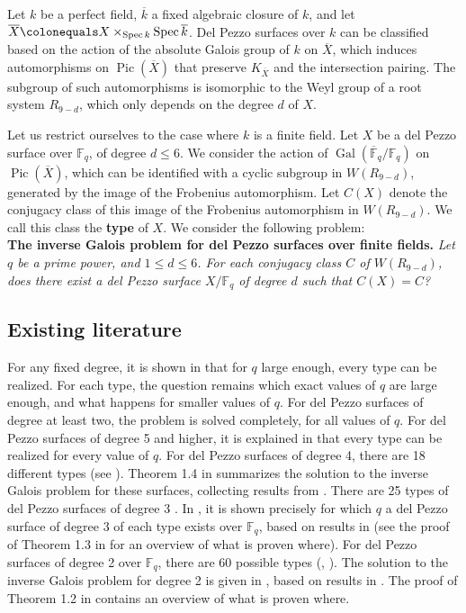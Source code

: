\documentclass[a4paper, 11pt, reqno]{amsart}
\numberwithin{equation}{section} \numberwithin{figure}{section}
\newcommand{\term}[1]{\textbf{#1}}          %
\DeclareMathOperator{\Pic}{Pic}
\DeclareMathOperator{\Gal}{Gal}
\DeclareMathOperator{\Spec}{Spec}
\def \F {{\mathbb F}}
\theoremstyle{definition}
\numberwithin{lemma}{section}
\begin{document}
Let $k$ be a perfect field, $\overline{k}$ a fixed algebraic closure of $k$, and let $\overline{X} \colonequals X \times_{\Spec k} \Spec \overline{k}$. Del Pezzo surfaces over $k$ can be classified based on the action of the absolute Galois group of $k$ on $\overline{X}$, which induces automorphisms on $\Pic(\overline{X})$ that preserve $K_{\overline{X}}$ and the intersection pairing. The subgroup of such automorphisms is isomorphic to the Weyl group of a root system $R_{9-d}$, which only depends on the degree $d$ of $X$.

Let us restrict ourselves to the case where $k$ is a finite field. Let $X$ be a del Pezzo surface over $\F_q$, of degree $d \leq 6$. We consider the action of $\Gal(\overline{\F}_q/\F_q)$ on $\Pic(\overline{X})$, which can be identified with a cyclic subgroup in $W(R_{9-d})$, generated by the image of the Frobenius automorphism. Let $C(X)$ denote the conjugacy class of this image of the Frobenius automorphism in $W(R_{9-d})$. We call this class the \term{type} of $X$. We consider the following problem:\\

\textbf{The inverse Galois problem for del Pezzo surfaces over finite fields.} \textit{Let $q$ be a prime power, and $1 \leq d \leq 6$. For each conjugacy class $C$ of $W(R_{9-d})$, does there exist a del Pezzo surface $X/\F_q$ of degree $d$ such that $C(X) = C$?}\\

\subsection{Existing literature}
For any fixed degree, it is shown in \cite[Corollary 1.8]{BFL} that for $q$ large enough, every type can be realized. For each type, the question remains which exact values of $q$ are large enough, and what happens for smaller values of $q$. For del Pezzo surfaces of degree at least two, the problem is solved completely, for all values of $q$. For del Pezzo surfaces of degree 5 and higher, it is explained in \cite[Proposition 3.1]{trepalin} that every type can be realized for every value of $q$. For del Pezzo surfaces of degree 4, there are 18 different types (see \cite[Table 4]{trepalin}). Theorem 1.4 in \cite{trepalin} summarizes the solution to the inverse Galois problem for these surfaces, collecting results from \cite{rybakov, BFL, trepalindeg2, trepalin}. There are 25 types of del Pezzo surfaces of degree 3 \cite[Table 7.1]{BFL}. In \cite[Theorem 1.1]{LoughranTrepalin}, it is shown precisely for which $q$ a del Pezzo surface of degree 3 of each type exists over $\F_q$, based on results in \cite{rybakov, SD, rybakovtrepalin, trepalindeg2, BFL, trepalin, LoughranTrepalin} (see the proof of Theorem 1.3 in \cite{trepalin} for an overview of what is proven where). For del Pezzo surfaces of degree 2 over $\F_q$, there are 60 possible types (\cite[Table 1]{urabe2}, \cite[Table 2]{trepalin}). The solution to the inverse Galois problem for degree 2 is given in \cite[Theorem 1.2]{LoughranTrepalin}, based on results in \cite{trepalindeg2, BFL, trepalin, LoughranTrepalin}. The proof of Theorem 1.2 in \cite{trepalin} contains an overview of what is proven where.
\end{document}

